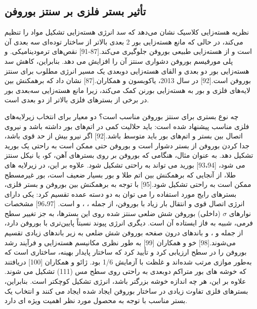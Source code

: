 \subsection{تأثیر بستر فلزی بر سنتز بوروفن}
نظریه هسته‌زایی کلاسیک نشان می‌دهد که سد انرژی هسته‌زایی تشکیل مواد را تنظیم می‌کند، در حالی که مانع هسته‌زایی بور 2 بعدی بالاتر از ساختار توده‌ای سه بعدی آن است و از هسته‌زایی طبیعی بوروفن جلوگیری می‌کند.\cite{liuProbingSynthesisTwoDimensional2013, piazzaPhotoelectronSpectroscopyInitio2012, sergeevaB22B23AllBoron2012, kiranPlanartotubularStructuralTransition2005, ogerBoronClusterCations2007}[87-91] نقص‌های ترمودینامیکی. و پلی مورفیسم بوروفن دشواری سنتز آن را افزایش می دهد. بنابراین، کاهش سد هسته‌زایی بور دو بعدی و القای هسته‌زایی دوبعدی یک مسیر انرژی مطلوب برای سنتز بوروفن است.\cite{liEvolutionGrapheneGrowth2009}[92] در سال 2013، یاکوبسون و همکاران.\cite{liuProbingSynthesisTwoDimensional2013}[87] نشان داد که برهمکنش بین لایه‌های فلزی و بور به هسته‌زایی بورنن کمک می‌کند، زیرا مانع هسته‌زایی سه‌بعدی بور در برخی از بسترهای فلزی بالاتر از دو بعدی است.

چه نوع بستری برای سنتز بوروفن مناسب است؟ دو معیار برای انتخاب زیرلایه‌های فلزی مناسب پیشنهاد شده است: باید حلالیت کمی در اتم‌های بور داشته باشد و نیروی اتصال بین بستر و اتم‌های بور باید متوسط باشد.\cite{liEvolutionGrapheneGrowth2009}[92] اگر نیرو بیش از حد قوی باشد، جدا کردن بوروفن از بستر دشوار است و بوروفن حتی ممکن است به راحتی یک بورید تشکیل دهد. به عنوان مثال، هنگامی که بوروفن بر روی بسترهای آهن، کو، یا نیکل سنتز می شود، \cite{vajeestonElectronicStructureBonding2001, burdettELECTRONICSTRUCTURETRANSITIONMETALBORIDES1986}[93،94] بورید می تواند به راحتی تشکیل شود. علاوه بر این، در زیرلایه های طلا، از آنجایی که برهمکنش بین اتم طلا و بور بسیار ضعیف است، بور غیرمسطح ممکن است به راحتی تشکیل شود.\cite{zhangTwoDimensionalBoronMonolayers2015}[95] با توجه به برهمکنش بین بوروفن و بستر فلزی، بسترهای رایج مورد استفاده را می توان به دو دسته عمده تقسیم کرد: یکی دارای انرژی اتصال قوی و انتقال بار زیاد با بوروفن، از جمله ، ، و  است. \cite{hyamEffectParticleSize2008, cepekEpitaxialGrowthMgB22004}[96،97] مشخصات نوارهای $\sigma$ (داخلی) بوروفن شش ضلعی سنتز شده روی این بسترها، به جز تغییر سطح فرمی، شبیه به فاز ایستاده آن است. دیگری انرژی پیوند نسبتاً پایین‌تری با بوروفن دارد، از جمله  و ، و باندهای درون صفحه بوروفن شش ضلعی به زیر باندهای زیادی تقسیم می‌شوند.\cite{zhangBoronSheetAdsorbed2012}[98] خو و همکاران \cite{xuNucleationGrowthBorophene2016}[99] به طور نظری مکانیسم هسته‌زایی و فرآیند رشد بوروفن را در سطح  ارزیابی کرد و تأیید کرد که ساختار پایدار بهینه، ساختاری است که  به‌طور موازی مرتب شده‌اند و غلظت  با آزمایش 1/6 بود. ژائو و همکاران \cite{liuBoronClusterTwoDimensional2013}[100] دریافتند که خوشه های بور متراکم دوبعدی به راحتی روی سطح مس (111) تشکیل می شوند. علاوه بر این، هر چه اندازه خوشه بزرگتر باشد، انرژی تشکیل کوچکتر است. بنابراین، بسترهای فلزی تفاوت زیادی در ساختار بوروفن ایجاد شده ایجاد می کنند و انتخاب یک بستر مناسب با توجه به محصول مورد نظر اهمیت ویژه ای دارد.

